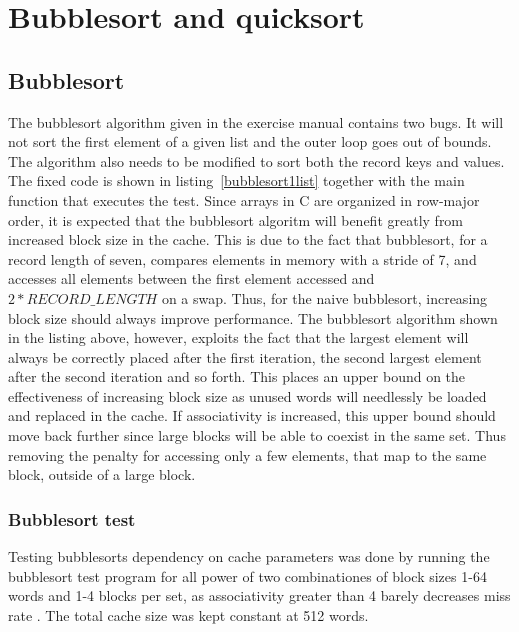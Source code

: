 \section{Bubblesort and quicksort}

\subsection{Bubblesort}
The bubblesort algorithm given in the exercise manual contains two bugs. It will not sort the first element of a given list and the 
outer loop goes out of bounds. The algorithm also needs to be modified to sort both the record keys and values. 
The fixed code is shown in listing~\ref{bubblesort1list} together with the main function that executes the test.
Since arrays in C are organized in row-major order, it is expected that the bubblesort algoritm will benefit greatly from increased
block size in the cache. This is due to the fact that bubblesort, for a record length of seven, compares elements in memory with a 
stride of 7, and accesses all elements between the first element accessed and \(2*RECORD\_LENGTH\) on a swap. Thus, for the naive
bubblesort, increasing block size should always improve performance. The bubblesort algorithm shown in the listing above, however, 
exploits the fact that the largest element will always be correctly placed after the first iteration, the second largest element
after the second iteration and so forth. This places an upper bound on the effectiveness of increasing block size as unused words
will needlessly be loaded and replaced in the cache. If associativity is increased, this upper bound should move back
further since large blocks will be able to coexist in the same set. Thus removing the penalty for accessing only a few 
elements, that map to the same block, outside of a large block.

\subsubsection{Bubblesort test}
Testing bubblesorts dependency on cache parameters was done by running the bubblesort test program for all power of two combinationes
of block sizes 1-64 words and 1-4 blocks per set, as associativity greater than 4 barely decreases miss rate \cite[p.~484]{HandP}.
The total cache size was kept constant at 512 words.

